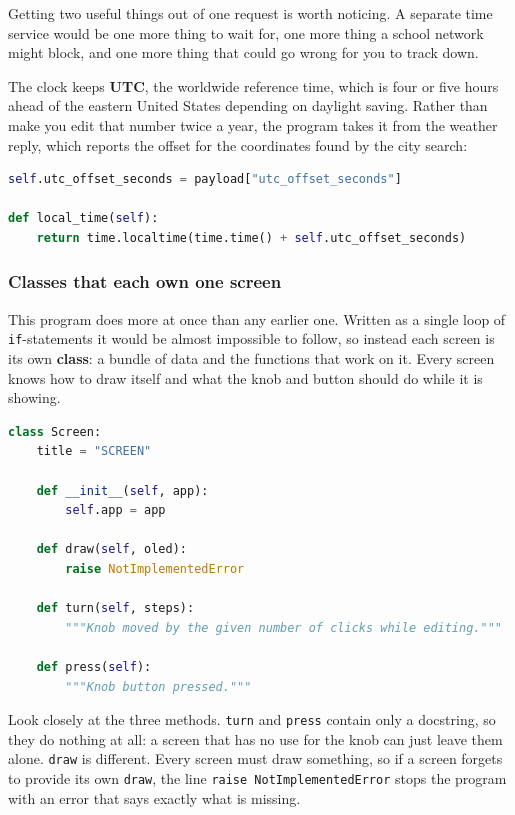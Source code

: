 Getting two useful things out of one request is worth noticing. A separate time service would be
one more thing to wait for, one more thing a school network might block, and one more thing that
could go wrong for you to track down.

The clock keeps \textbf{UTC}, the worldwide reference time, which is four or five hours ahead of
the eastern United States depending on daylight saving. Rather than make you edit that number twice
a year, the program takes it from the weather reply, which reports the offset for the coordinates
found by the city search:

\begin{lstlisting}[language=Python, caption=Turning UTC into local time]
self.utc_offset_seconds = payload["utc_offset_seconds"]

def local_time(self):
    return time.localtime(time.time() + self.utc_offset_seconds)
\end{lstlisting}

\subsubsection{Classes that each own one screen}
This program does more at once than any earlier one. Written as a single loop of
\texttt{if}-statements it would be almost impossible to follow, so instead each screen is its own
\textbf{class}: a bundle of data and the functions that work on it. Every screen knows how to draw
itself and what the knob and button should do while it is showing.

\begin{lstlisting}[language=Python, caption=The shared shape of every screen]
class Screen:
    title = "SCREEN"

    def __init__(self, app):
        self.app = app

    def draw(self, oled):
        raise NotImplementedError

    def turn(self, steps):
        """Knob moved by the given number of clicks while editing."""

    def press(self):
        """Knob button pressed."""
\end{lstlisting}

Look closely at the three methods. \texttt{turn} and \texttt{press} contain only a docstring, so
they do nothing at all: a screen that has no use for the knob can just leave them alone.
\texttt{draw} is different. Every screen must draw something, so if a screen forgets to provide its
own \texttt{draw}, the line \texttt{raise NotImplementedError} stops the program with an error that
says exactly what is missing.


